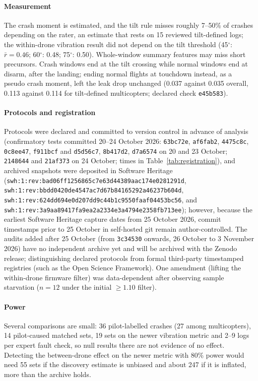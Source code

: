 \documentclass[preprint,12pt]{elsarticle}
\begin{document}
\paragraph{Measurement} The crash moment is estimated, and the tilt rule misses roughly 7--50\% of crashes depending on the rater, an estimate that rests on 15 reviewed tilt-defined logs; the within-drone vibration result did not depend on the tilt threshold (45$^\circ$: $\bar r=0.46$; 60$^\circ$: 0.48; 75$^\circ$: 0.50). Whole-window summary features may miss short precursors. Crash windows end at the tilt crossing while normal windows end at disarm, after the landing; ending normal flights at touchdown instead, as a pseudo crash moment, left the leak drop unchanged (0.037 against 0.035 overall, 0.113 against 0.114 for tilt-defined multicopters; declared check \texttt{e45b583}).

\paragraph{Protocols and registration} Protocols were declared and committed to version control in advance of
analysis (confirmatory tests committed 20--24 October 2026: \texttt{63bc72e}, \texttt{af6fab2}, \texttt{4475c8c}, \texttt{0c8ee47}, \texttt{f911bcf} and \texttt{d5d56c7}, \texttt{8b417d2}, \texttt{d7a6574} on 20 and 23 October; \texttt{2148644} and \texttt{21af373} on 24 October; times in Table~\ref{tab:registration}), and archived snapshots were deposited in Software Heritage (\nolinkurl{swh:1:rev:bad06ff1256865c7e63d44389aac174e0281291d},
\nolinkurl{swh:1:rev:bbdd0420de4547ac7d67b84165292a46237b604d}, \nolinkurl{swh:1:rev:624dd694e0d207dd9c44b1c9550faaf04453bc56}, and
\nolinkurl{swh:1:rev:3a9aa89417fa9ea2a2334e3a4794e2358fb713ee}); however, because the earliest Software Heritage capture dates from 25 October 2026, commit timestamps prior to 25 October in self-hosted git remain
author-controlled. The audits added after 25 October (from \texttt{3c34530} onwards, 26 October to 3 November 2026) have no independent archive yet and will be archived with the Zenodo release; distinguishing declared protocols from formal third-party timestamped registries (such as the Open Science
Framework). One amendment (lifting the within-drone firmware filter) was data-dependent after observing sample starvation ($n=12$
under the initial $\ge 1.10$ filter).

\paragraph{Power} Several comparisons are small: 36 pilot-labelled crashes (27 among multicopters), 14 pilot-caused matched sets, 19 sets on the newer vibration metric and 2--9 logs per expert fault check, so null results there are not evidence of no effect. Detecting the between-drone effect on the newer metric with 80\% power would need 55 sets if the discovery estimate is unbiased and about 247 if it is inflated, more than the archive holds.
\end{document}
